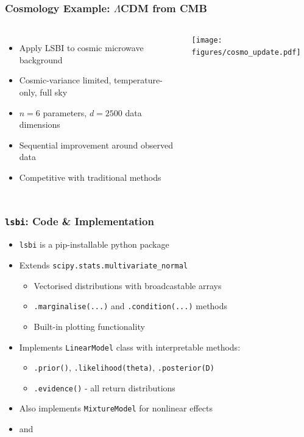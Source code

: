 \documentclass[aspectratio=169]{beamer}
\begin{document}
\begin{frame}
    \frametitle{Cosmology Example: $\Lambda$CDM from CMB}
    \begin{columns}
        \begin{itemize}
            \item Apply LSBI to cosmic microwave background
            \item Cosmic-variance limited, temperature-only, full sky
            \item $n=6$ parameters, $d=2500$ data dimensions
            \item Sequential improvement around observed data
            \item Competitive with traditional methods
        \end{itemize}

        \texttt{[image: figures/cosmo\_update.pdf]}
    \end{columns}
\end{frame}

\begin{frame}
    \frametitle{\texttt{lsbi}: Code \& Implementation}
    \begin{itemize}
        \item \texttt{lsbi} is a pip-installable python package
        \item Extends \texttt{scipy.stats.multivariate\_normal}
            \begin{itemize}
                \item Vectorised distributions with broadcastable arrays
                \item \texttt{.marginalise(...)} and \texttt{.condition(...)} methods
                \item Built-in plotting functionality
            \end{itemize}
        \item Implements \texttt{LinearModel} class with interpretable methods:
            \begin{itemize}
                \item \texttt{.prior()}, \texttt{.likelihood(theta)}, \texttt{.posterior(D)}
                \item \texttt{.evidence()} - all return distributions
            \end{itemize}
        \item Also implements \texttt{MixtureModel} for nonlinear effects
        \item {} and 
    \end{itemize}
\end{frame}
\end{document}
